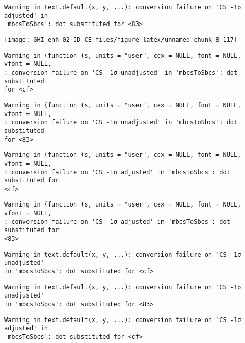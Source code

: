 \documentclass[
  10pt,
  a4paper,oneside]{article}
\begin{document}
\begin{verbatim}
Warning in text.default(x, y, ...): conversion failure on 'CS -1σ adjusted' in
'mbcsToSbcs': dot substituted for <83>
\end{verbatim}

\begin{center}\texttt{[image: GHI\_enh\_02\_ID\_CE\_files/figure-latex/unnamed-chunk-8-117]} \end{center}

\begin{verbatim}
Warning in (function (s, units = "user", cex = NULL, font = NULL, vfont = NULL,
: conversion failure on 'CS -1σ unadjusted' in 'mbcsToSbcs': dot substituted
for <cf>
\end{verbatim}

\begin{verbatim}
Warning in (function (s, units = "user", cex = NULL, font = NULL, vfont = NULL,
: conversion failure on 'CS -1σ unadjusted' in 'mbcsToSbcs': dot substituted
for <83>
\end{verbatim}

\begin{verbatim}
Warning in (function (s, units = "user", cex = NULL, font = NULL, vfont = NULL,
: conversion failure on 'CS -1σ adjusted' in 'mbcsToSbcs': dot substituted for
<cf>
\end{verbatim}

\begin{verbatim}
Warning in (function (s, units = "user", cex = NULL, font = NULL, vfont = NULL,
: conversion failure on 'CS -1σ adjusted' in 'mbcsToSbcs': dot substituted for
<83>
\end{verbatim}

\begin{verbatim}
Warning in text.default(x, y, ...): conversion failure on 'CS -1σ unadjusted'
in 'mbcsToSbcs': dot substituted for <cf>
\end{verbatim}

\begin{verbatim}
Warning in text.default(x, y, ...): conversion failure on 'CS -1σ unadjusted'
in 'mbcsToSbcs': dot substituted for <83>
\end{verbatim}

\begin{verbatim}
Warning in text.default(x, y, ...): conversion failure on 'CS -1σ adjusted' in
'mbcsToSbcs': dot substituted for <cf>
\end{verbatim}
\end{document}
